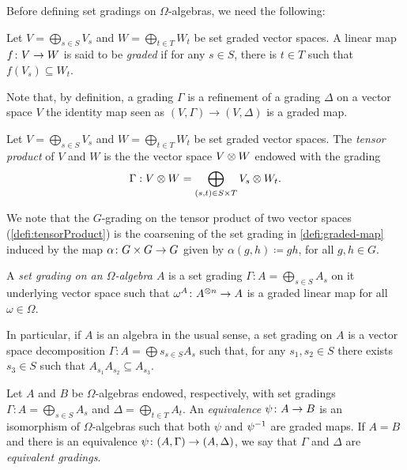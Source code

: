 Before defining set gradings on $\Omega$-algebras, we need the following:

\begin{defi}\label{defi:graded-map}
    Let $V = \bigoplus_{s\in S} V_s$ and $W = \bigoplus_{t\in T} W_t$ be set graded vector spaces. 
    A linear map $f\colon V \to W$ is said to be  \emph{graded} if for any $s \in S$, there is $t \in T$ such that $f(V_s) \subseteq W_t$. 
\end{defi}

Note that, by definition, a grading $\Gamma$ is a refinement of a grading $\Delta$ on a vector space $V$ \IFF the identity map seen as $(V, \Gamma) \to (V, \Delta)$ is a graded map. 

\begin{defi}
    Let $V = \bigoplus_{s\in S} V_s$ and $W = \bigoplus_{t\in T} W_t$ be set graded vector spaces. 
    The \emph{tensor product} of $V$ and $W$ is the the vector space $V \otimes W$ endowed with the grading
    \[
        \Gamma : V \otimes W = \bigoplus_{(s,t) \in S \times T} V_s \otimes W_t. 
    \]
\end{defi}

    We note that the $G$-grading on the tensor product of two  vector spaces (\cref{defi:tensorProduct}) is the coarsening of the set grading in \cref{defi:graded-map} induced by the map $\alpha\colon G\times G \to G$ given by $\alpha (g,h) \coloneqq gh$, for all $g,h \in G$. 

\begin{defi}
    A \emph{set grading on an $\Omega$-algebra $A$} is a set grading $\Gamma : A = \bigoplus_{s\in S} A_s$ on it underlying vector space such that $\omega^A\colon A^{\otimes n} \to A$ is a graded linear map for all $\omega \in \Omega$. 
\end{defi}

In particular, if $A$ is an algebra in the usual sense, a set grading on $A$ is a vector space decomposition $\Gamma : A = \bigoplus s_{s\in S} A_s$ such that, for any $s_1,s_2\in S$ there exists $s_3\in S$ such that $A_{s_1} A_{s_2} \subseteq A_{s_3}$.

\begin{defi}\label{defi:equivalence}
    Let $A$ and $B$ be $\Omega$-algebras endowed, respectively, with set gradings ${\Gamma : A = \bigoplus_{s \in S} A_{s}}$ and ${\Delta = \bigoplus_{t \in T} A_{t}}$. 
    An \emph{equivalence} $\psi\colon A \to B$ is an isomorphism of $\Omega$-algebras such that both $\psi$ and $\psi^{-1}$ are graded maps. 
    If $A = B$ and there is an equivalence $\psi\colon (A, \Gamma) \to (A, \Delta)$, we say that $\Gamma$ and $\Delta$ are \emph{equivalent gradings}. 
\end{defi}

